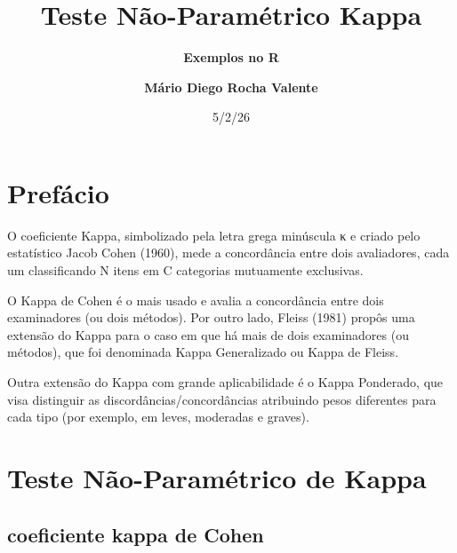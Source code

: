 \documentclass[
  letterpaper,
  DIV=11,
  numbers=noendperiod]{scrreprt}
\title{\textbf{Teste Não-Paramétrico Kappa}}
\subtitle{\textbf{Exemplos no R}}
\author{\textbf{Mário Diego Rocha Valente}}
\date{5/2/26}
\renewcommand*\contentsname{Table of contents}
\newcommand\contentsname{Table of contents}
\begin{document}
\maketitle
\ifdefined\Shaded\renewenvironment{Shaded}{\begin{tcolorbox}[interior hidden, sharp corners, borderline west={3pt}{0pt}{shadecolor}, boxrule=0pt, enhanced, breakable, frame hidden]}{\end{tcolorbox}}\fi

\renewcommand*\contentsname{Table of contents}
{
\hypersetup{linkcolor=}
\setcounter{tocdepth}{2}
\tableofcontents
}

\hypertarget{prefuxe1cio}{%
\chapter*{Prefácio}\label{prefuxe1cio}}


O coeficiente Kappa, simbolizado pela letra grega minúscula κ e criado
pelo estatístico Jacob Cohen (1960), mede a concordância entre dois
avaliadores, cada um classificando N itens em C categorias mutuamente
exclusivas.

O Kappa de Cohen é o mais usado e avalia a concordância entre dois
examinadores (ou dois métodos). Por outro lado, Fleiss (1981) propôs uma
extensão do Kappa para o caso em que há mais de dois examinadores (ou
métodos), que foi denominada Kappa Generalizado ou Kappa de Fleiss.

Outra extensão do Kappa com grande aplicabilidade é o Kappa Ponderado,
que visa distinguir as discordâncias/concordâncias atribuindo pesos
diferentes para cada tipo (por exemplo, em leves, moderadas e graves).


\hypertarget{teste-nuxe3o-paramuxe9trico-de-kappa}{%
\chapter{Teste Não-Paramétrico de
Kappa}\label{teste-nuxe3o-paramuxe9trico-de-kappa}}

\hypertarget{coeficiente-kappa-de-cohen}{%
\section{coeficiente kappa de Cohen}\label{coeficiente-kappa-de-cohen}}
\end{document}
